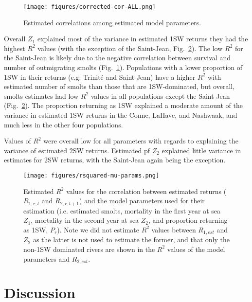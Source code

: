 \documentclass[12pt]{article}
\newcommand{\Pg}{$P_r$\xspace}
\begin{document}
\begin{figure}[htbp] \centering
    \texttt{[image: figures/corrected-cor-ALL.png]}
    \caption{Estimated correlations among estimated model parameters.}
    \label{fig:cor-params} 
\end{figure}

Overall $Z_1$ explained most of the variance in estimated 1SW returns they had
the highest $R^2$ values (with the exception of the Saint-Jean,
Fig.~\ref{fig:mu-rsq}).
The low $R^2$ for the Saint-Jean is likely due to the negative correlation
between survival and number of outmigrating smolts (Fig.~\ref{fig:cor-params}). 
Populations with a lower proportion of 1SW in their returns (e.g. Trinit\'{e}
and Saint-Jean) have a higher $R^2$ with estimated number of smolts than those
that are 1SW-dominated, but overall, smolts estimates had low $R^2$ values in 
all populations except the Saint-Jean (Fig.~\ref{fig:mu-rsq}).
The proportion returning as 1SW explained a moderate amount of the variance in
estimated 1SW returns in the Conne, LaHave, and Nashwaak, and much less in the
other four populations.

Values of $R^2$ were overall low for all parameters with regards to explaining
the variance of estimated 2SW returns. Estimated pf $Z_2$ explained little
variance in estimates for 2SW returns, with the Saint-Jean again being the
exception.

\begin{figure}[htbp] \centering
    \texttt{[image: figures/rsquared-mu-params.png]}
    \caption{Estimated $R^2$ values for the correlation between estimated
        returns ($R_{1,r,t}$ and $R_{2,r,t+1}$) and the model parameters used
        for their estimation (i.e. estimated smolts, mortality in the first
        year at sea $Z_1$, mortality in the second year at sea $Z_2$, and
        proportion returning as 1SW, \Pg). Note we did not estimate $R^2$
        values between $R_{1,est}$ and $Z_2$ as the latter is not used to
        estimate the former, and that only the non-1SW dominated rivers are
        shown in the $R^2$ values of the model parameters and $R_{2,est}$.}
    \label{fig:mu-rsq} 
\end{figure}


\section*{Discussion} 

\end{document}
